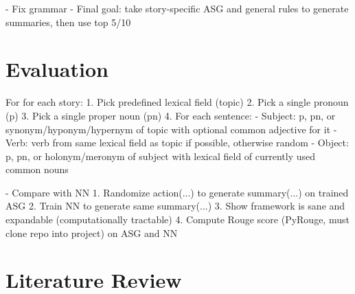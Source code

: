 \documentclass[12pt,twoside]{report}
\theoremstyle{definition}
\begin{document}
- Fix grammar
- Final goal: take story-specific ASG and general rules to generate summaries, then use top 5/10

\chapter{Evaluation}


For for each story:
1. Pick predefined lexical field (topic)
2. Pick a single pronoun (p)
3. Pick a single proper noun (pn)
4. For each sentence:
    - Subject: p, pn, or synonym/hyponym/hypernym of topic with optional common adjective for it
    - Verb: verb from same lexical field as topic if possible, otherwise random
    - Object: p, pn, or holonym/meronym of subject with lexical field of currently used common nouns
    

- Compare with NN
    1. Randomize action(...) to generate summary(...) on trained ASG
    2. Train NN to generate same summary(...)
    3. Show framework is sane and expandable (computationally tractable)
    4. Compute Rouge score (PyRouge, must clone repo into project) on ASG and NN

\chapter{Literature Review}


\begin{appendices}


\end{appendices}



\pagestyle{PageNum}
\end{document}

